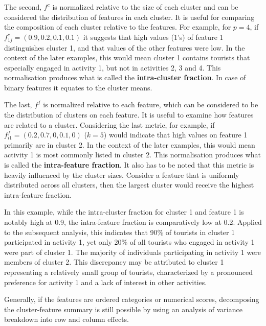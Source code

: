 \documentclass[article]{ajs}
\begin{document}
The second, $f^c$ is normalized relative to the size of each cluster and can be considered the distribution of features in each cluster. It is useful for comparing the composition of each cluster relative to the features. For example, for $p=4$, if $f^c_{1j} = (0.9, 0.2, 0.1, 0.1)$ it suggests that high values (1's) of feature 1 distinguishes cluster 1, and that values of the other  features were low. In the context of the later examples, this would mean cluster 1 contains tourists that especially engaged in activity 1, but not in activities 2, 3 and 4. This normalisation produces what is called the {\bf intra-cluster fraction}. In case of binary features it equates to the cluster means.

The last, $f^f$ is normalized relative to each feature, which can be considered to be the distribution of clusters on each feature. It is useful to examine how features are related to a cluster. Considering the last metric, for example, if $f^f_{i1} = (0.2, 0.7, 0, 0.1, 0)$ ($k=5$) would indicate that high values on feature 1 primarily are in cluster 2. In the context of the later examples, this would mean activity 1 is most commonly listed in cluster 2. This normalisation produces what is called the {\bf intra-feature fraction}. It also has to be noted that this metric is heavily influenced by the cluster sizes. Consider a feature that is uniformly distributed across all clusters, then the largest cluster would receive the highest intra-feature fraction.

In this example, while the intra-cluster fraction for cluster 1 and feature 1 is notably high at 0.9, the intra-feature fraction is comparatively low at 0.2. Applied to the subsequent analysis, this indicates that 90\% of tourists in cluster 1 participated in activity 1, yet only 20\% of all tourists who engaged in activity 1 were part of cluster 1. The majority of individuals participating in activity 1 were members of cluster 2. This discrepancy may be attributed to cluster 1 representing a relatively small group of tourists, characterized by a pronounced preference for activity 1 and a lack of interest in other activities.

Generally, if the features are ordered categories or numerical scores, decomposing the cluster-feature summary is still possible by using an analysis of variance breakdown into row and column effects.

\end{document}
